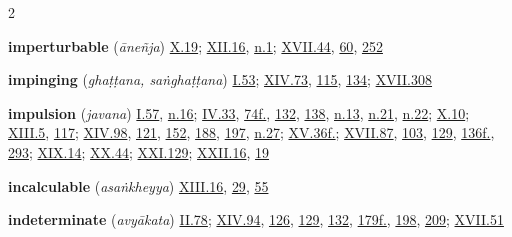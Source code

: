 \begin{multicols}{2}
\begin{vismHanging}
\par\textbf{imperturbable} (\emph{āneñja}) \hyperlink{X.19}{X.19}{}; \hyperlink{XII.16}{XII.16}{}, \hyperlink{XII.n1}{n.1}{}; \hyperlink{XVII.44}{XVII.44}{}, \hyperlink{XVII.60}{60}{}, \hyperlink{XVII.252}{252}{}
\par\textbf{impinging} (\emph{ghaṭṭana, saṅghaṭṭana}) \hyperlink{I.53}{I.53}{}; \hyperlink{XIV.73}{XIV.73}{}, \hyperlink{XIV.115}{115}{}, \hyperlink{XIV.134}{134}{}; \hyperlink{XVII.308}{XVII.308}{}
\par\textbf{impulsion} (\emph{javana}) \hyperlink{I.57}{I.57}{}, \hyperlink{I.n16}{n.16}{}; \hyperlink{IV.33}{IV.33}{}, \hyperlink{IV.74}{74f.}{}, \hyperlink{IV.132}{132}{}, \hyperlink{IV.138}{138}{}, \hyperlink{IV.n13}{n.13}{}, \hyperlink{IV.n21}{n.21}{}, \hyperlink{IV.n22}{n.22}{}; \hyperlink{X.10}{X.10}{}; \hyperlink{XIII.5}{XIII.5}{}, \hyperlink{XIII.117}{117}{}; \hyperlink{XIV.98}{XIV.98}{}, \hyperlink{XIV.121}{121}{}, \hyperlink{XIV.152}{152}{}, \hyperlink{XIV.188}{188}{}, \hyperlink{XIV.197}{197}{}, \hyperlink{XIV.n27}{n.27}{}; \hyperlink{XV.36}{XV.36f.}{}; \hyperlink{XVII.87}{XVII.87}{}, \hyperlink{XVII.103}{103}{}, \hyperlink{XVII.129}{129}{}, \hyperlink{XVII.136}{136f.}{}, \hyperlink{XVII.293}{293}{}; \hyperlink{XIX.14}{XIX.14}{}; \hyperlink{XX.44}{XX.44}{}; \hyperlink{XXI.129}{XXI.129}{}; \hyperlink{XXII.16}{XXII.16}{}, \hyperlink{XXII.19}{19}{}
\par\textbf{incalculable} (\emph{asaṅkheyya}) \hyperlink{XIII.16}{XIII.16}{}, \hyperlink{XIII.29}{29}{}, \hyperlink{XIII.55}{55}{}
\par\textbf{indeterminate} (\emph{avyākata}) \hyperlink{II.78}{II.78}{}; \hyperlink{XIV.94}{XIV.94}{}, \hyperlink{XIV.126}{126}{}, \hyperlink{XIV.129}{129}{}, \hyperlink{XIV.132}{132}{}, \hyperlink{XIV.179}{179f.}{}, \hyperlink{XIV.198}{198}{}, \hyperlink{XIV.209}{209}{}; \hyperlink{XVII.51}{XVII.51}{}

\end{vismHanging}
\end{multicols}
